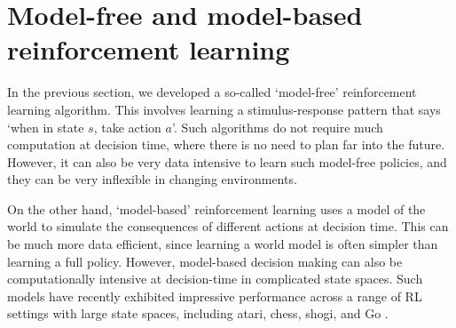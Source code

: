 \section{Model-free and model-based reinforcement learning}

In the previous section, we developed a so-called `model-free' reinforcement learning algorithm.
This involves learning a stimulus-response pattern that says `when in state $s$, take action $a$'.
Such algorithms do not require much computation at decision time, where there is no need to plan far into the future.
However, it can also be very data intensive to learn such model-free policies, and they can be very inflexible in changing environments.

On the other hand, `model-based' reinforcement learning uses a model of the world to simulate the consequences of different actions at decision time.
This can be much more data efficient, since learning a world model is often simpler than learning a full policy.
However, model-based decision making can also be computationally intensive at decision-time in complicated state spaces.
Such models have recently exhibited impressive performance across a range of RL settings with large state spaces, including atari, chess, shogi, and Go \citep{silver2018general, schrittwieser2020mastering}.

